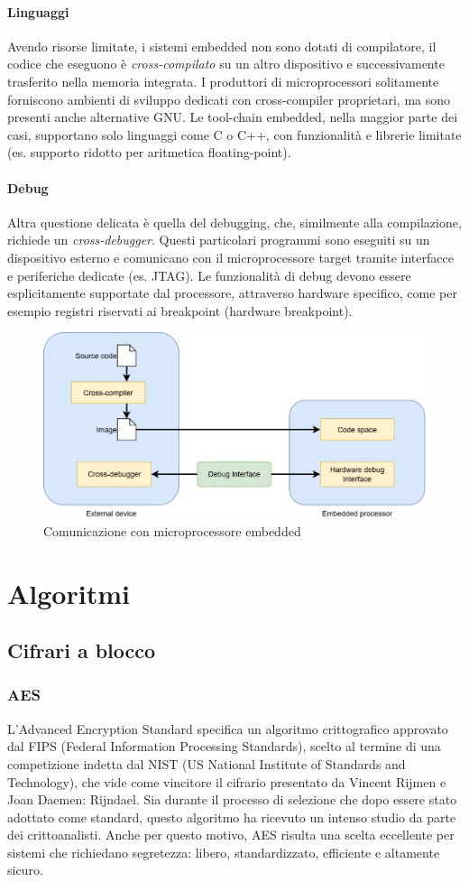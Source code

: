 \documentclass[target=bach,aauheader=,style=]{thud}
\begin{document}
    		\subsubsection{Linguaggi}
    		Avendo risorse limitate, i sistemi embedded non sono dotati di compilatore, il codice che eseguono è \textit{cross-compilato} su un altro dispositivo e successivamente trasferito nella memoria integrata. I produttori di microprocessori solitamente forniscono ambienti di sviluppo dedicati con cross-compiler proprietari, ma sono presenti anche alternative GNU.
    		Le tool-chain embedded, nella maggior parte dei casi, supportano solo linguaggi come C o C++, con funzionalità e librerie limitate (es. supporto ridotto per aritmetica floating-point).
			\subsubsection{Debug}
			Altra questione delicata è quella del debugging, che, similmente alla compilazione, richiede un \textit{cross-debugger}. Questi particolari programmi sono eseguiti su un dispositivo esterno e comunicano con il microprocessore target tramite interfacce e periferiche dedicate (es. JTAG).
			Le funzionalità di debug devono essere esplicitamente supportate dal processore, attraverso hardware specifico, come per esempio registri riservati ai breakpoint (hardware breakpoint).
			
			\begin{figure}[h]
				\centering
				\includegraphics[width=0.5\linewidth]{img/cross-compiler-debugger.jpg}
				\caption{Comunicazione con microprocessore embedded}
				\label{fig:mcucomm}
			\end{figure}
			    		
\chapter{Algoritmi}
	\section{Cifrari a blocco}
		\subsection{AES}
		L'Advanced Encryption Standard specifica un algoritmo crittografico approvato dal FIPS (Federal Information Processing Standards), scelto al termine di una competizione indetta dal NIST (US National Institute of Standards and Technology), che vide come vincitore il cifrario presentato da Vincent Rijmen e Joan Daemen: Rijndael\cite{aes}. Sia durante il processo di selezione che dopo essere stato adottato come standard, questo algoritmo ha ricevuto un intenso studio da parte dei crittoanalisti. Anche per questo motivo, AES risulta una scelta eccellente per sistemi che richiedano segretezza: libero, standardizzato, efficiente e altamente sicuro. \cite{moderncrypto}
\end{document}
